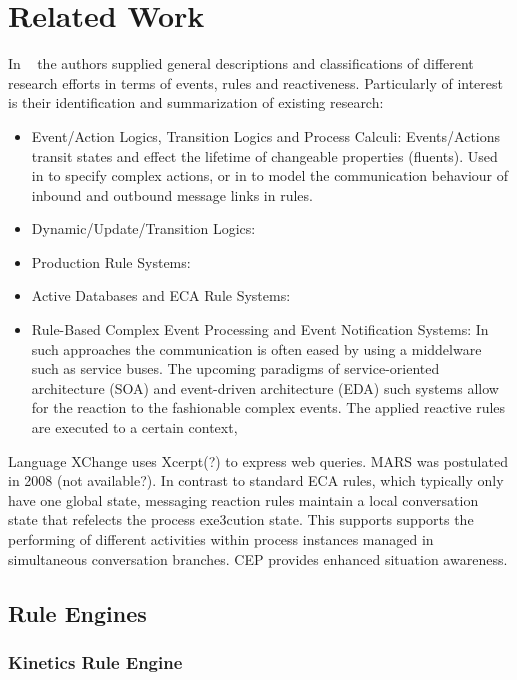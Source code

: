 \documentclass[11pt,twocolumn]{article}
\begin{document}
\section{Related Work}
In ~\cite{2009-Paschke_Boley-RCER.pdf} the authors supplied general descriptions and classifications of different research efforts in terms of events, rules and reactiveness. Particularly of interest is their identification and summarization of existing research:
 \begin{itemize}
\itemsep-1.5em
  \item Event/Action Logics, Transition Logics and Process Calculi: Events/Actions transit states and effect the lifetime of changeable properties (fluents). Used in \cite{Behrends:2008:EEA:1377798.1377801} to specify complex actions, or in to model the communication behaviour of inbound and outbound message links in rules.
  \item Dynamic/Update/Transition Logics: 
  \item Production Rule Systems:
  \item Active Databases and ECA Rule Systems:
  \item Rule-Based Complex Event Processing and Event Notification Systems: In such approaches the communication is often eased by using a middelware such as service buses. The upcoming paradigms of service-oriented architecture (SOA) and event-driven architecture (EDA) such systems allow for the reaction to the fashionable complex events. The applied reactive rules are executed to a certain context,

\end{itemize}
Language XChange uses Xcerpt(?) to express web queries. MARS was postulated in 2008 (not available?).
In contrast to standard ECA rules, which typically only have one global state, messaging reaction rules maintain a local conversation state that refelects the process exe3cution state. This supports supports the performing of different activities within process instances managed in simultaneous conversation branches.
CEP  provides enhanced situation awareness.


\subsection{Rule Engines}

\subsubsection{Kinetics Rule Engine}
\end{document}
